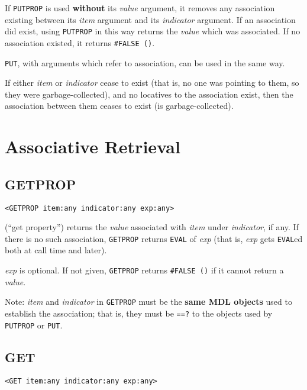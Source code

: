 \documentclass[a4paper]{scrbook}
\begin{document}
If \texttt{PUTPROP} is used \textbf{without} its \emph{value} argument, it removes any association existing between its
\emph{item} argument and its \emph{indicator} argument. If an association did exist, using \texttt{PUTPROP} in this way
returns the \emph{value} which was associated. If no association existed, it returns \texttt{\#FALSE\ ()}.

\texttt{PUT}, with arguments which refer to association, can be used in the same way.

If either \emph{item} or \emph{indicator} cease to exist (that is, no one was pointing to them, so they were
garbage-collected), and no locatives to the association exist, then the association between them ceases to exist (is
garbage-collected).

\section{Associative Retrieval}\label{associative-retrieval}

\subsection{GETPROP}\label{getprop}

\begin{verbatim}
<GETPROP item:any indicator:any exp:any>
\end{verbatim}

 (``get property'') returns the \emph{value} associated with \emph{item} under
\emph{indicator}, if any. If there is no such association, \texttt{GETPROP} returns \texttt{EVAL} of \emph{exp} (that is,
\emph{exp} gets \texttt{EVAL}ed both at call time and later).

\emph{exp} is optional. If not given, \texttt{GETPROP} returns \texttt{\#FALSE\ ()} if it cannot return a \emph{value}.

Note: \emph{item} and \emph{indicator} in \texttt{GETPROP} must be the \textbf{same MDL objects} used to establish the
association; that is, they must be \texttt{==?} to the objects used by \texttt{PUTPROP} or \texttt{PUT}.

\subsection{GET}\label{get-1}

\begin{verbatim}
<GET item:any indicator:any exp:any>
\end{verbatim}
\end{document}
